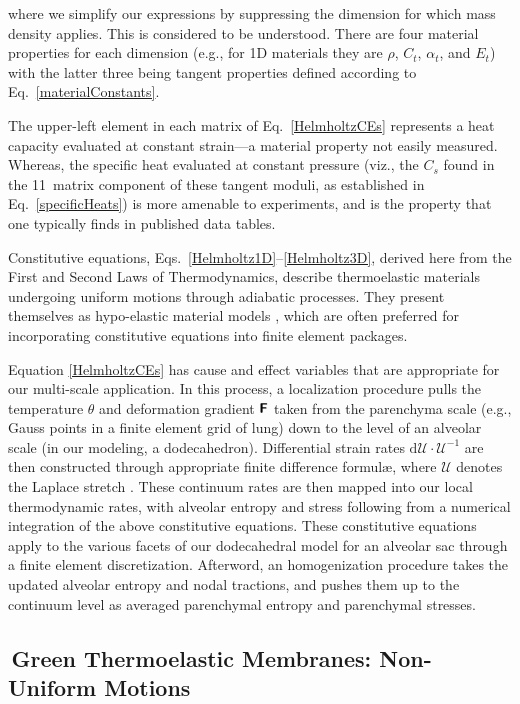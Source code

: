 where we simplify our expressions by suppressing the dimension for which mass density applies.  This is considered to be understood.  There are four material properties for each dimension (e.g., for 1D materials they are $\rho$, $C_t$, $\alpha_t$, and $E_t$) with the latter three being tangent properties defined according to Eq.~\ref{materialConstants}.

The upper-left element in each matrix of Eq.~\ref{HelmholtzCEs} represents a heat capacity evaluated at constant strain---a material property not easily measured.  Whereas, the specific heat evaluated at constant pressure (viz., the $C_s$ found in the 11~matrix component of these tangent moduli, as established in Eq.~\ref{specificHeats}) is more amenable to experiments, and is the property that one typically finds in published data tables.  

Constitutive equations, Eqs.~\ref{Helmholtz1D}--\ref{Helmholtz3D}, derived here from the First and Second Laws of Thermo\-dynamics, describe thermo\-elastic materials undergoing uniform motions through adiabatic processes.  They present themselves as hypo-elastic material models \cite{Truesdell55}, which are often preferred for incorporating constitutive equations into finite element packages.

Equation \ref{HelmholtzCEs} has cause and effect variables that are appropriate for our multi-scale application.  In this process, a localization procedure pulls the temperature $\theta$ and deformation gradient $\boldsymbol{\mathsf{F}}$ taken from the parenchyma scale (e.g., Gauss points in a finite element grid of lung) down to the level of an alveolar scale (in our modeling, a dodecahedron).  Differential strain rates $\mathrm{d} \boldsymbol{\mathcal{U}} \cdot \boldsymbol{\mathcal{U}}^{-1}$ are then constructed through appropriate finite difference formul\ae, where $\boldsymbol{\mathcal{U}}$ denotes the Laplace stretch \cite{Freedetal19}. These continuum rates are then mapped into our local thermo\-dynamic rates, with alveolar entropy and stress following from a numerical integration of the above constitutive equations.  These constitutive equations apply to the various facets of our dodecahedral model for an alveolar sac through a finite element discretization.  Afterword, an homogenization procedure takes the updated alveolar entropy and nodal tractions, and pushes them up to the continuum level as averaged parenchymal entropy and parenchymal stresses. 

\subsection{$\,$Green Thermoelastic Membranes: Non-Uniform Motions}
\label{secNonuniform2D}

